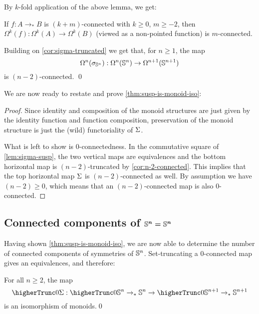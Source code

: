 \documentclass[english,a4paper]{lmcs}
\begin{document}
By $k$-fold application of the above lemma, we get:
\begin{cor} \label{cor:n-2-connected}
    If $f : A \to_* B$ is $(k+m)$-connected with $k \geq 0$, $m \geq -2$, then
    $\Omega^k(f) : \Omega^k(A) \to \Omega^k(B)$ (viewed as a non-pointed function) is $m$-connected.

    Building on \cref{cor:sigma-truncated} we get that, for $n \geq 1$, the map
    \begin{equation}
      \mathop{\Omega^{n}} (\sigma_{{\mathbb S^{n}}}) : \Omega^n({\mathbb S^{n}}) \to \Omega^{n+1}({\mathbb S^{n+1}})
    \end{equation}
    is $(n-2)$-connected.
    \qed
\end{cor}

We are now ready to restate and prove \cref{thm:susp-is-monoid-iso}:

\suspiso*
\begin{proof}
    Since identity and composition of the monoid structures are just given by the identity function and function composition,
    preservation of the monoid structure is just the (wild) functoriality of $\operatorname{\Sigma}$.

    What is left to show is $0$-connectedness.
    In the commutative square of \cref{lem:sigma-susp}, the two vertical maps are equivalences and the bottom horizontal map is $(n-2)$-truncated by \cref{cor:n-2-connected}.
    This implies that the top horizontal map $\operatorname{\Sigma}$ is $(n-2)$-connected as well.
    By assumption we have $(n-2) \geq 0$, which means that an $(n-2)$-connected map is also $0$-connected.
\end{proof}

\subsection{Connected components of \texorpdfstring{$\boldsymbol{{\mathbb S^{n}} = {\mathbb S^{n}}}$}{Sn = Sn}}

Having shown \cref{thm:susp-is-monoid-iso}, we are now able to determine the number of connected components of symmetries of ${\mathbb S^{n}}$.
Set-truncating a $0$-connected map gives an equivalences, and therefore:
\begin{cor} \label{cor:iso-of-monoids}
    For all $n \geq 2$, the map
    \begin{equation}
    \higherTrunc 0 {\susp} : \higherTrunc 0 {\Sn n \to_* \Sn n} \to \higherTrunc 0 {\Sn {n+1} \to_* \Sn {n+1}}
    \end{equation}
    is an isomorphism of monoids.\qed
\end{cor}
\end{document}
